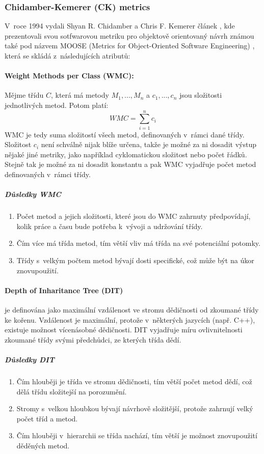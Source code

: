 \documentclass[11pt,twoside,a4paper]{book}
\begin{document}
\subsubsection{Chidamber-Kemerer (CK) metrics}
V~roce 1994 vydali Shyan R. Chidamber a Chris F. Kemerer článek \cite{CK94}, kde prezentovali svou sotfwarovou metriku pro
objektově orientovaný návrh známou také pod názvem \mbox{MOOSE} (Metrics for Object-Oriented Software Engineering) \cite{LKaMOODextra},
která se skládá z~následujících atributů:

\paragraph{Weight Methods per Class (WMC):} Mějme třídu $C$, která má metody $M_1, ..., M_n$ a $c_1, ..., c_n$
jsou složitosti jednotlivých metod. Potom platí:
$$WMC=\sum_{i=1}^{n}{c_i}$$
WMC je tedy suma složitostí všech metod, definovaných v~rámci dané třídy. Složitost $c_i$ není schválně nijak
blíže určena, takže je možné za ni dosadit výstup nějaké jiné metriky, jako například cyklomatickou složitost
nebo počet řádků. Stejně tak je možné za ni dosadit konstantu a pak WMC vyjadřuje počet metod definovaných
v~rámci třídy.

\subparagraph{Důsledky WMC}
\begin{enumerate}
\item Počet metod a jejich složitosti, které jsou do WMC zahrnuty předpovídají, kolik práce a času bude potřeba k~vývoji a udržování třídy.
\item Čím více má třída metod, tím větší vliv má třída na své potenciální potomky.
\item Třídy s~velkým počtem metod bývají dosti specifické, což může být na úkor \mbox{znovupoužití}.
\end{enumerate}


\paragraph{Depth of Inharitance Tree (DIT)} je definována jako maximální vzdálenost ve stromu dědičnosti od zkoumané třídy ke kořenu.
Vzdálenost je maximální, protože v~některých jazycích (např. C++), existuje možnost vícenásobné dědičnosti.
DIT vyjadřuje míru ovlivnitelnosti zkoumané třídy svými předchůdci, ze kterých třída dědí.

\subparagraph{Důsledky DIT}
\begin{enumerate}
\item Čím hlouběji je třída ve stromu dědičnosti, tím větší počet metod dědí, což dělá třídu složitejší na porozumění.
\item Stromy s~velkou hloubkou bývají návrhově složitější, protože zahrnují velký počet tříd a metod.
\item Čím hlouběji v~hierarchii se třída nachází, tím větší je možnost znovupoužití děděných metod.
\end{enumerate}
\end{document}
